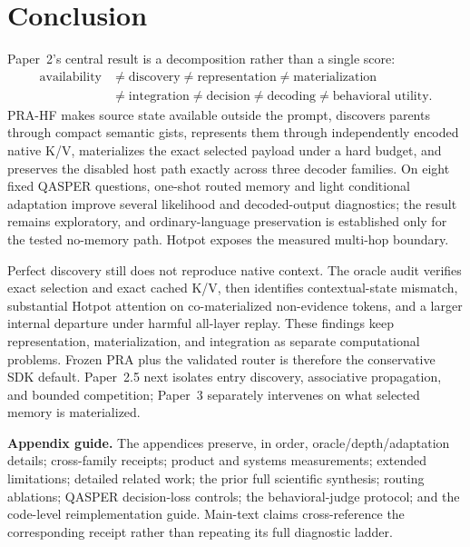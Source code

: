 \documentclass[11pt]{article}
\begin{document}
\section{Conclusion}

Paper~2's central result is a decomposition rather than a single score:
\begin{equation}
\begin{aligned}
\text{availability}&\neq\text{discovery}\neq\text{representation}\neq\text{materialization}\\
&\neq\text{integration}\neq\text{decision}\neq\text{decoding}\neq\text{behavioral utility}.
\end{aligned}
\end{equation}
PRA-HF makes source state available outside the prompt, discovers parents through compact semantic
gists, represents them through independently encoded native K/V, materializes the exact selected
payload under a hard budget, and preserves the disabled host path exactly across three decoder
families. On eight fixed QASPER questions, one-shot routed memory and light conditional adaptation
improve several likelihood and decoded-output diagnostics; the result remains exploratory, and
ordinary-language preservation is established only for the tested no-memory path. Hotpot exposes
the measured multi-hop boundary.

Perfect discovery still does not reproduce native context.  The oracle audit verifies exact
selection and exact cached K/V, then identifies contextual-state mismatch, substantial Hotpot
attention on co-materialized non-evidence tokens, and a larger internal departure under harmful
all-layer replay.  These findings keep representation, materialization, and integration as
separate computational problems.  Frozen PRA plus the validated router is therefore the
conservative SDK default. Paper~2.5 next isolates entry discovery, associative propagation, and
bounded competition; Paper~3 separately intervenes on what selected memory is materialized.

\clearpage
\appendix

\noindent\textbf{Appendix guide.}
The appendices preserve, in order, oracle/depth/adaptation details; cross-family receipts;
product and systems measurements; extended limitations; detailed related work; the prior full
scientific synthesis; routing ablations; QASPER decision-loss controls; the behavioral-judge
protocol; and the code-level reimplementation guide.  Main-text claims cross-reference the
corresponding receipt rather than repeating its full diagnostic ladder.
\end{document}
